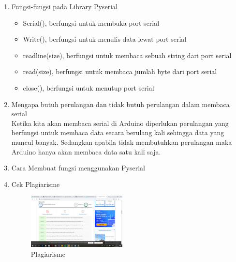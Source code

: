 \begin{enumerate}
\item Fungsi-fungsi pada Library Pyserial
\begin{itemize}
\item Serial(), berfungsi untuk membuka port serial
\item Write(), berfungsi untuk menulis data lewat port serial
\item readline(size), berfungsi untuk membaca sebuah string dari port serial
\item read(size), berfungsi untuk membaca jumlah byte dari port serial
\item close(), berfungsi untuk menutup port serial
\end{itemize}

\item Mengapa butuh perulangan dan tidak butuh perulangan dalam membaca serial\\
Ketika kita akan membaca serial di Arduino diperlukan perulangan yang berfungsi untuk membaca data secara berulang kali sehingga data yang muncul banyak. Sedangkan apabila tidak membutuhkan perulangan maka Arduino hanya akan membaca data satu kali saja.

\item Cara Membuat fungsi menggunakan Pyserial


\item Cek Plagiarisme
\begin{figure}[ht!]
\includegraphics[width=5cm]{figures/5/1174054/plagiarisme.png}
\centering
\caption{Plagiarisme}
\end{figure}

\end{enumerate}


